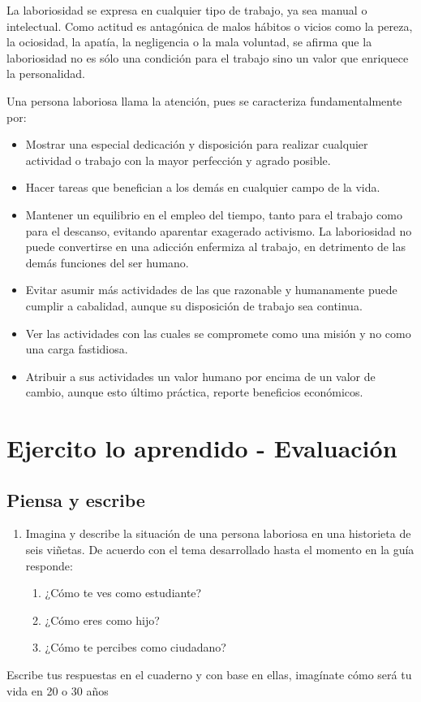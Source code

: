 \documentclass[10pt,twoside]{article}
\begin{document}
La laboriosidad se expresa en cualquier tipo de trabajo, ya sea
manual o intelectual. Como actitud es antagónica de malos hábitos
o vicios como la pereza, la ociosidad, la apatía, la negligencia o la
mala voluntad, se afirma que la laboriosidad no es sólo una condición
para el trabajo sino un valor que enriquece la personalidad.

Una persona laboriosa llama la atención, pues se caracteriza
fundamentalmente por:
\begin{itemize}
\item Mostrar una especial dedicación y disposición para realizar
cualquier actividad o trabajo con la mayor perfección y
agrado posible.
\item Hacer tareas que benefician a los demás en cualquier campo
de la vida.
\item Mantener un equilibrio en el empleo del tiempo,
tanto para el trabajo como para el descanso, evitando
aparentar exagerado activismo. La laboriosidad no
puede convertirse en una adicción enfermiza al trabajo,
en detrimento de las demás funciones del ser humano.
\item Evitar asumir más actividades de las que razonable y
humanamente puede cumplir a cabalidad, aunque su
disposición de trabajo sea continua.
\item Ver las actividades con las cuales se compromete como
una misión y no como una carga fastidiosa.
\item Atribuir a sus actividades un valor humano por encima
de un valor de cambio, aunque esto último
práctica, reporte beneficios económicos.
\end{itemize}
\section*{Ejercito lo aprendido - Evaluaci\'{o}n}
\subsection*{Piensa y escribe}
\begin{enumerate}
\item Imagina y describe la situación de una persona laboriosa en
una historieta de seis viñetas.
De acuerdo con el tema desarrollado hasta el momento en la
guía responde:
\begin{enumerate}
\item ¿Cómo te ves como estudiante?
\item ¿Cómo eres como hijo?
\item ¿Cómo te percibes como ciudadano?
\end{enumerate}
\end{enumerate}
Escribe tus respuestas en el cuaderno y con base en ellas,
imagínate cómo será tu vida en 20 o 30 años
\end{document}
